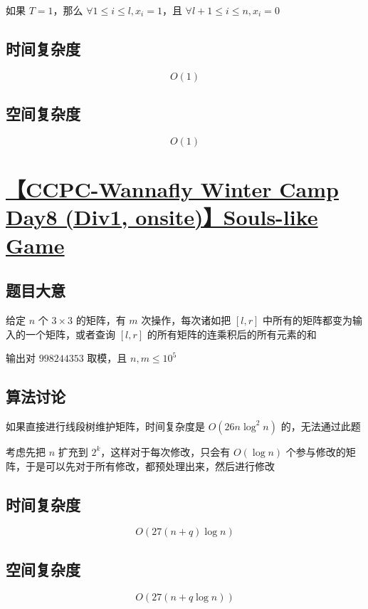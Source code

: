 \documentclass[UTF8]{article}
\begin{document}
如果 $T=1$，那么 $\forall 1 \le i \le l,x_i=1$，且 $\forall l+1 \le i \le n,x_i=0$

\subsection{时间复杂度}

$$
O(1)
$$

\subsection{空间复杂度}

$$
O(1)
$$

\section{\href{https://www.zhixincode.com/contest/28/problem/E?problem_id=408}{【CCPC-Wannafly Winter Camp Day8 (Div1, onsite)】Souls-like Game}}

\subsection{题目大意}

给定 $n$ 个 $3 \times 3$ 的矩阵，有 $m$ 次操作，每次诸如把 $[l,r]$ 中所有的矩阵都变为输入的一个矩阵，或者查询 $[l,r]$ 的所有矩阵的连乘积后的所有元素的和

输出对 $998244353$ 取模，且 $n,m \le 10^5$

\subsection{算法讨论}

如果直接进行线段树维护矩阵，时间复杂度是 $O(26 n\log^2n)$ 的，无法通过此题

考虑先把 $n$ 扩充到 $2^k$，这样对于每次修改，只会有 $O(\log n)$ 个参与修改的矩阵，于是可以先对于所有修改，都预处理出来，然后进行修改

\subsection{时间复杂度}

$$
O(27 (n+q) \log n)
$$

\subsection{空间复杂度}

$$
O(27 (n+q \log n))
$$
\end{document}
